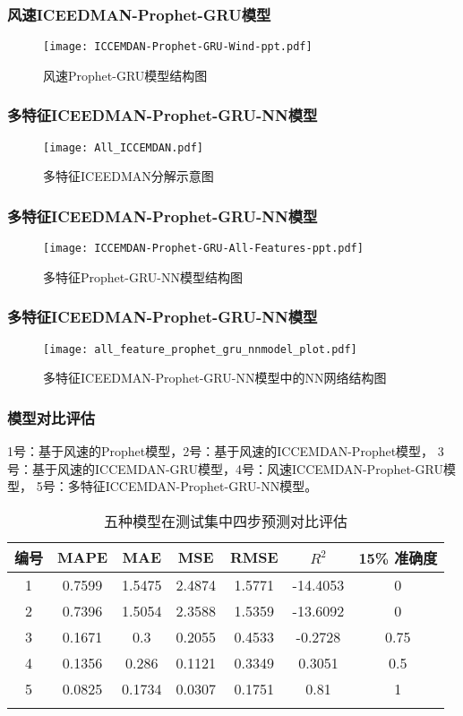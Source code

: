 \documentclass[14pt, AutoFakeBold]{ppt}
\begin{document}
\begin{frame}
  \frametitle{风速ICEEDMAN-Prophet-GRU模型}
  \begin{figure}[H]
    \centering
      \texttt{[image: ICCEMDAN-Prophet-GRU-Wind-ppt.pdf]}
      \caption{风速Prophet-GRU模型结构图}
      \label{fig_ICCEMDAN_Prophet_GRU_Wind}
  \end{figure}  
\end{frame}

\begin{frame}
  \frametitle{多特征ICEEDMAN-Prophet-GRU-NN模型}
  \begin{figure}[H]
    \centering
      \texttt{[image: All\_ICCEMDAN.pdf]}
      \caption{多特征ICEEDMAN分解示意图}
      \label{fig_All_ICCEMDAN}
  \end{figure}
\end{frame}

\begin{frame}
  \frametitle{多特征ICEEDMAN-Prophet-GRU-NN模型}
  \begin{figure}[H]
    \centering
      \texttt{[image: ICCEMDAN-Prophet-GRU-All-Features-ppt.pdf]}
      \caption{多特征Prophet-GRU-NN模型结构图}
      \label{fig_ICCEMDAN_Prophet_GRU_All_Features}
  \end{figure}
\end{frame}

\begin{frame}
  \frametitle{多特征ICEEDMAN-Prophet-GRU-NN模型}
  \begin{figure}[H]
    \centering
      \texttt{[image: all\_feature\_prophet\_gru\_nnmodel\_plot.pdf]}
      \caption{多特征ICEEDMAN-Prophet-GRU-NN模型中的NN网络结构图}
      \label{fig_gru_nn}
  \end{figure}
\end{frame}

\begin{frame}
  \frametitle{模型对比评估}
  1号：基于风速的Prophet模型，2号：基于风速的ICCEMDAN-Prophet模型，
  3号：基于风速的ICCEMDAN-GRU模型，4号：风速ICCEMDAN-Prophet-GRU模型，
  5号：多特征ICCEMDAN-Prophet-GRU-NN模型。
  \begin{table}[H]
    \centering
    \caption{五种模型在测试集中四步预测对比评估}
    \begin{tabular}{ccccccc}
    \toprule
    编号 & MAPE & MAE & MSE & RMSE & $R^2$ & 15\% 准确度 \\
    \midrule
    1 & 0.7599 & 1.5475 & 2.4874 & 1.5771 & -14.4053 & 0 \\
    2 & 0.7396 & 1.5054 & 2.3588 & 1.5359 & -13.6092 & 0 \\
    3 & 0.1671 & 0.3 & 0.2055 & 0.4533 & -0.2728 & 0.75 \\
    4 & 0.1356 & 0.286 & 0.1121 & 0.3349 & 0.3051 & 0.5 \\
    5 & 0.0825 & 0.1734 & 0.0307 & 0.1751 & 0.81 & 1 \\
    \bottomrule \\
    \end{tabular} \\
    \label{models-metrics}
  \end{table}
\end{frame}
\end{document}
